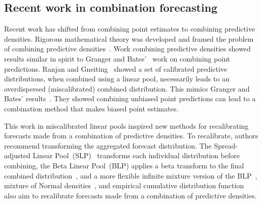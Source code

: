 \documentclass[preprint]{elsarticle}
\begin{document}
\subsection{Recent work in combination forecasting}

Recent work has shifted from combining point estimates to combining predictive densities.
Rigorous mathematical theory was developed and framed the problem of combining predictive densities~\cite{gneiting2013combining}.
Work combining predictive densities showed results similar in spirit to Granger and Bates'~\cite{bates1969combination,granger1984improved} work on combining point predictions.
Ranjan and Gneiting~\cite{ranjan2010combining,gneiting2013combining} showed a set of calibrated predictive distributions, when combined using a linear pool, necessarily leads to an overdispersed (miscalibrated) combined distribution.
This mimics Granger and Bates' results~\cite{bates1969combination}. 
They showed combining unbiased point predictions can lead to a combination method that makes biased point estimates.

This work in miscalibrated linear pools inspired new methods for recalibrating forecasts made from a combination of predictive densities. To recalibrate, authors recommend transforming the aggregated forecast distribution.
The Spread-adjusted Linear Pool~(SLP)~\cite{berrocal2007combining,glahn2009mos,kleiber2011locally} transforms each individual distribution before combining, the Beta Linear Pool~(BLP) applies a beta transform to the final combined  distribution~\cite{gneiting2013combining,ranjan2010combining}, and a more flexible infinite mixture version of the BLP~\cite{bassetti2018bayesian}, mixture of Normal densities~\cite{baran2018combining}, and empirical cumulative distribution function~\cite{garratt2019empirically} also aim to recalibrate forecasts made from a combination of predictive densities.
\end{document}
